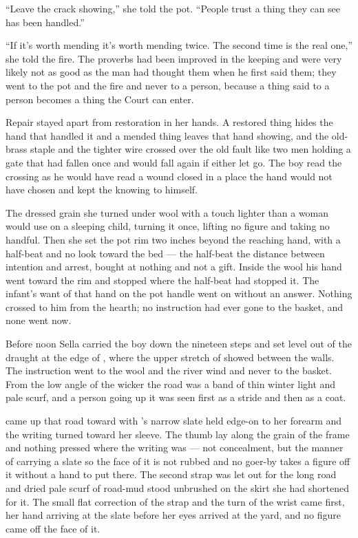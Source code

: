 “Leave the crack showing,” she told the pot. “People trust a thing they can see has been handled.”

“If it's worth mending it's worth mending twice. The second time is the real one,” she told the fire. The proverbs had been improved in the keeping and were very likely not as good as the man had thought them when he first said them; they went to the pot and the fire and never to a person, because a thing said to a person becomes a thing the Court can enter.

Repair stayed apart from restoration in her hands. A restored thing hides the hand that handled it and a mended thing leaves that hand showing, and the old-brass staple and the tighter wire crossed over the old fault like two men holding a gate that had fallen once and would fall again if either let go. The boy read the crossing as he would have read a wound closed in a place the hand would not have chosen and kept the knowing to himself.

The dressed grain she turned under wool with a touch lighter than a woman would use on a sleeping child, turning it once, lifting no figure and taking no handful. Then she set the pot rim two inches beyond the reaching hand, with a half-beat and no look toward the bed --- the half-beat the distance between intention and arrest, bought at nothing and not a gift. Inside the wool his hand went toward the rim and stopped where the half-beat had stopped it. The infant's want of that hand on the pot handle went on without an answer. Nothing crossed to him from the hearth; no instruction had ever gone to the basket, and none went now.

\scenebreak

Before noon Sella carried the boy down the nineteen steps and set  level out of the draught at the edge of , where the upper stretch of  showed between the walls. The instruction went to the wool and the river wind and never to the basket. From the low angle of the wicker the road was a band of thin winter light and pale scurf, and a person going up it was seen first as a stride and then as a coat.

 came up that road toward  with 's narrow slate held edge-on to her forearm and the writing turned toward her sleeve. The thumb lay along the grain of the frame and nothing pressed where the writing was --- not concealment, but the manner of carrying a slate so the face of it is not rubbed and no goer-by takes a figure off it without a hand to put there. The second strap was let out for the long road and dried pale scurf of road-mud stood unbrushed on the skirt she had shortened for it. The small flat correction of the strap and the turn of the wrist came first, her hand arriving at the slate before her eyes arrived at the yard, and no figure came off the face of it.

